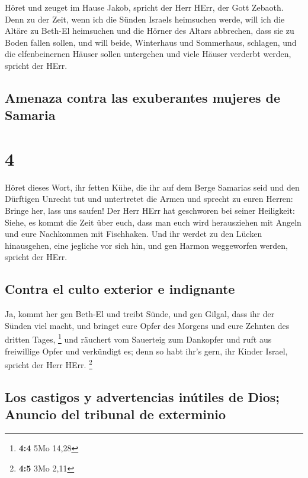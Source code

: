  Höret und zeuget im Hause Jakob, spricht der Herr HErr,
der Gott Zebaoth.  Denn zu der Zeit, wenn ich die Sünden
Israels heimsuchen werde, will ich die Altäre zu Beth-El heimsuchen und
die Hörner des Altars abbrechen, dass sie zu Boden fallen sollen,
 und will beide, Winterhaus und Sommerhaus, schlagen, und
die elfenbeinernen Häuser sollen untergehen und viele Häuser verderbt
werden, spricht der HErr.

\hypertarget{amenaza-contra-las-exuberantes-mujeres-de-samaria}{%
\subsection{Amenaza contra las exuberantes mujeres de
Samaria}\label{amenaza-contra-las-exuberantes-mujeres-de-samaria}}

\hypertarget{section-3}{%
\section{4}\label{section-3}}

 Höret dieses Wort, ihr fetten Kühe, die ihr auf dem Berge
Samarias seid und den Dürftigen Unrecht tut und untertretet die Armen
und sprecht zu euren Herren: Bringe her, lass uns saufen! 
Der Herr HErr hat geschworen bei seiner Heiligkeit: Siehe, es kommt die
Zeit über euch, dass man euch wird herausziehen mit Angeln und eure
Nachkommen mit Fischhaken.  Und ihr werdet zu den Lücken
hinausgehen, eine jegliche vor sich hin, und gen Harmon weggeworfen
werden, spricht der HErr.

\hypertarget{contra-el-culto-exterior-e-indignante}{%
\subsection{Contra el culto exterior e
indignante}\label{contra-el-culto-exterior-e-indignante}}

 Ja, kommt her gen Beth-El und treibt Sünde, und gen
Gilgal, dass ihr der Sünden viel macht, und bringet eure Opfer des
Morgens und eure Zehnten des dritten Tages, \footnote{\textbf{4:4} 5Mo
  14,28}  und räuchert vom Sauerteig zum Dankopfer und
ruft aus freiwillige Opfer und verkündigt es; denn so habt ihr's gern,
ihr Kinder Israel, spricht der Herr HErr. \footnote{\textbf{4:5} 3Mo
  2,11}

\hypertarget{los-castigos-y-advertencias-inuxfatiles-de-dios-anuncio-del-tribunal-de-exterminio}{%
\subsection{Los castigos y advertencias inútiles de Dios; Anuncio del
tribunal de
exterminio}\label{los-castigos-y-advertencias-inuxfatiles-de-dios-anuncio-del-tribunal-de-exterminio}}

